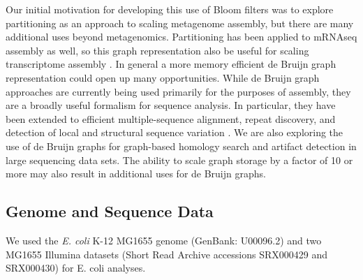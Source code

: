 \documentclass{pnastwo}
\begin{document}
\begin{article}
Our initial motivation for developing this use of Bloom filters was to
explore partitioning as an approach to scaling metagenome assembly,
but there are many additional uses beyond metagenomics.  Partitioning
has been applied to mRNAseq assembly as well, so this graph representation also be
useful for scaling transcriptome assembly \cite{trinity}.  In general
a more memory efficient de Bruijn graph representation could open up
many opportunities.  While de Bruijn graph approaches are currently
being used primarily for the purposes of assembly, they are a broadly
useful formalism for sequence analysis. In particular, they have been
extended to efficient multiple-sequence alignment\cite{zhang2003dna},
repeat discovery\cite{price2005novo}, and detection of local and
structural sequence variation \cite{zerbinothesis}.  We are also
exploring the use of de Bruijn graphs for graph-based homology search
and artifact detection in large sequencing data sets.  The ability to
scale graph storage by a factor of 10 or more may also result in
additional uses for de Bruijn graphs.


\begin{materials}

\section{Genome and Sequence Data}
We used the \emph{E. coli} K-12 MG1655 genome (GenBank: U00096.2) and two MG1655 Illumina 
datasets (Short Read Archive accessions SRX000429 and SRX000430) for E. coli
analyses.


\end{materials}
\end{article}
\end{document}
